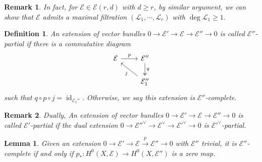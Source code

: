 \documentclass{ctexart}
\newtheorem{definition}{Definition}[section]
\newtheorem{remark}{Remark}[section]
\newtheorem{lemma}{Lemma}[section]
\newcommand{\identity}{\operatorname{id}}
\begin{document}
\begin{remark}
    In fact, for $\mathcal{E}\in \mathcal{E}(r, d)$ with $d \ge r$,
    by similar argument, we can show that $\mathcal{E}$ admits a maximal filtration $(\mathcal{L}_{1}, \cdots, \mathcal{L}_{r})$ with $\deg \mathcal{L}_{1} \ge 1$.
\end{remark}
\begin{definition}
    An extension of vector bundles $0 \rightarrow \mathcal{E}' \rightarrow \mathcal{E} \rightarrow \mathcal{E}'' \rightarrow 0$ is called $\mathcal{E}''$-partial if there is a commutative diagram
    \begin{equation}
        \begin{tikzcd}
            \mathcal{E} \arrow[r, "p"] &
            \mathcal{E}'' \arrow[d, twoheadrightarrow, "q"] \\
            & \mathcal{E}_{1}'' \arrow[ul, "j"]
        \end{tikzcd}
    \end{equation}
    such that $q \circ p \circ j = \identity_{\mathcal{E}_{1}''}$.
    Otherwise, we say this extension is $\mathcal{E}''$-complete.
\end{definition}
\begin{remark}
    Dually, An extension of vector bundles $0 \rightarrow \mathcal{E}' \rightarrow \mathcal{E} \rightarrow \mathcal{E}'' \rightarrow 0$ is called $\mathcal{E}'$-partial if the dual extension $0 \rightarrow \mathcal{E}''^{\vee} \rightarrow \mathcal{E}^{\vee} \rightarrow \mathcal{E}'^{\vee} \rightarrow 0$ is $\mathcal{E}'^{\vee}$-partial.
\end{remark}
\begin{lemma}
    Given an extension $0 \rightarrow \mathcal{E}' \rightarrow \mathcal{E} \overset{p}{\rightarrow} \mathcal{E}'' \rightarrow 0$ with $\mathcal{E}''$ trivial,
    it is $\mathcal{E}''$-complete if and only if $p_{\ast}: H^{0}(X, \mathcal{E}) \to H^{0}(X, \mathcal{E}'')$ is a zero map.
    \label{Lemma 5.12}
\end{lemma}
\end{document}
